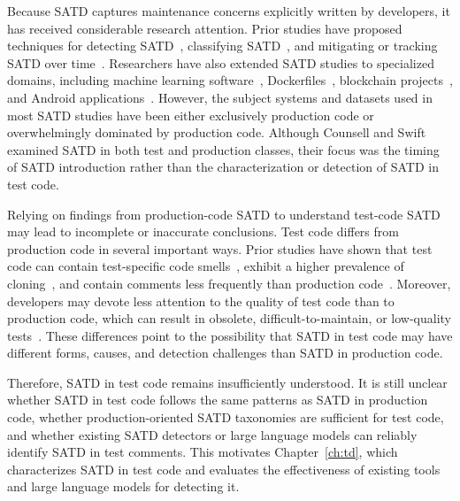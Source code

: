 Because SATD captures maintenance concerns explicitly written by developers, it has received considerable research attention. Prior studies have proposed techniques for detecting SATD~\cite{maldonado_detecting_2015, liu_satd_2018, huang_identifying_2018, li_automatic_2023, sheikhaei_empirical_2024, maldonado_using_2017, gama_towards_2024, rantala_prevalence_2020}, classifying SATD~\cite{zhu_detecting_2021, maldonado_detecting_2015, obrien_artifact_2022, bhatia_empirical_2025}, and mitigating or tracking SATD over time~\cite{maldonado_empirical_2017, zampetti_was_2018, zampetti_automatically_2020, iammarino_empirical_2021, liu_exploratory_2021, mastropaolo_towards_2023}. Researchers have also extended SATD studies to specialized domains, including machine learning software~\cite{obrien_artifact_2022, bhatia_empirical_2025}, Dockerfiles~\cite{azuma_empirical_2022}, blockchain projects~\cite{pinna_investigation_2023}, and Android applications~\cite{wilder_exploratory_2023}. However, the subject systems and datasets used in most SATD studies have been either exclusively production code or overwhelmingly dominated by production code. Although Counsell and Swift~\cite{counsell_timing_2022} examined SATD in both test and production classes, their focus was the timing of SATD introduction rather than the characterization or detection of SATD in test code.

Relying on findings from production-code SATD to understand test-code SATD may lead to incomplete or inaccurate conclusions. Test code differs from production code in several important ways. Prior studies have shown that test code can contain test-specific code smells~\cite{bavota_are_2015, tufano_empirical_2016}, exhibit a higher prevalence of cloning~\cite{van_bladel_comparative_2023}, and contain comments less frequently than production code~\cite{counsell_comparing_2016}. Moreover, developers may devote less attention to the quality of test code than to production code, which can result in obsolete, difficult-to-maintain, or low-quality tests~\cite{counsell_comparing_2016, beller_developer_2019, beller_when_2015, zaidman_studying_2011, athanasiou_test_2014, spadini_relation_2018}. These differences point to the possibility that SATD in test code may have different forms, causes, and detection challenges than SATD in production code.

Therefore, SATD in test code remains insufficiently understood. It is still unclear whether SATD in test code follows the same patterns as SATD in production code, whether production-oriented SATD taxonomies are sufficient for test code, and whether existing SATD detectors or large language models can reliably identify SATD in test comments. This motivates Chapter~\ref{ch:td}, which characterizes SATD in test code and evaluates the effectiveness of existing tools and large language models for detecting it.

